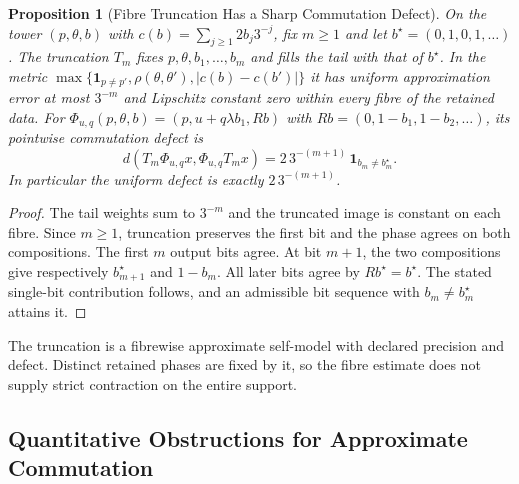 \documentclass[11pt,a4paper]{article}
\newtheorem{proposition}[theorem]{Proposition}
\theoremstyle{definition}
\begin{document}
\begin{proposition}[Fibre Truncation Has a Sharp Commutation Defect]\label{prop:sigma-fibre-truncation}
On the tower $(p,\theta,b)$ with $c(b)=\sum_{j\ge1}2b_j3^{-j}$, fix $m\ge1$ and let $b^\star=(0,1,0,1,\ldots)$. The truncation $T_m$ fixes $p,\theta,b_1,\ldots,b_m$ and fills the tail with that of $b^\star$. In the metric $\max\{\mathbf1_{p\ne p'},\rho(\theta,\theta'),|c(b)-c(b')|\}$ it has uniform approximation error at most $3^{-m}$ and Lipschitz constant zero within every fibre of the retained data. For $\Phi_{u,q}(p,\theta,b)=(p,u+q\lambda b_1,Rb)$ with $Rb=(0,1-b_1,1-b_2,\ldots)$, its pointwise commutation defect is
\[
 d(T_m\Phi_{u,q}x,\Phi_{u,q}T_m x)
 =2\,3^{-(m+1)}\,\mathbf1_{b_m\ne b^\star_m}.
\]
In particular the uniform defect is exactly $2\,3^{-(m+1)}$.
\end{proposition}
\begin{proof}
The tail weights sum to $3^{-m}$ and the truncated image is constant on each fibre. Since $m\ge1$, truncation preserves the first bit and the phase agrees on both compositions. The first $m$ output bits agree. At bit $m+1$, the two compositions give respectively $b^\star_{m+1}$ and $1-b_m$. All later bits agree by $Rb^\star=b^\star$. The stated single-bit contribution follows, and an admissible bit sequence with $b_m\ne b^\star_m$ attains it.
\end{proof}

The truncation is a fibrewise approximate self-model with declared precision and defect. Distinct retained phases are fixed by it, so the fibre estimate does not supply strict contraction on the entire support.

\subsection{Quantitative Obstructions for Approximate Commutation}
\end{document}
